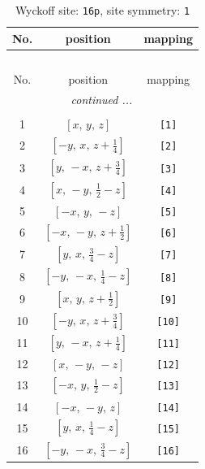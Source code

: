 \documentclass[fleqn,8pt]{jsarticle}
\begin{document}
\begin{longtable}{ccc}
\caption{Wyckoff site: {\tt 16p}, site symmetry: {\tt 1}}
 \\
 \hline \hline
No. & position & mapping \\ \hline \endfirsthead

\multicolumn{2}{l}{\tablename\ \thetable{}} \\
 \hline \hline
No. & position & mapping \\ \hline \endhead

 \hline \hline
\multicolumn{2}{r}{\footnotesize\it continued ...} \\ \endfoot

 \hline \hline
\multicolumn{2}{r}{} \\ \endlastfoot

1 & $\left[ x,\, y,\, z \right]$ & {\tt [1]} \\ \hline
2 & $\left[ - y,\, x,\, z + \frac{1}{4} \right]$ & {\tt [2]} \\ \hline
3 & $\left[ y,\, - x,\, z + \frac{3}{4} \right]$ & {\tt [3]} \\ \hline
4 & $\left[ x,\, - y,\, \frac{1}{2} - z \right]$ & {\tt [4]} \\ \hline
5 & $\left[ - x,\, y,\, - z \right]$ & {\tt [5]} \\ \hline
6 & $\left[ - x,\, - y,\, z + \frac{1}{2} \right]$ & {\tt [6]} \\ \hline
7 & $\left[ y,\, x,\, \frac{3}{4} - z \right]$ & {\tt [7]} \\ \hline
8 & $\left[ - y,\, - x,\, \frac{1}{4} - z \right]$ & {\tt [8]} \\ \hline
9 & $\left[ x,\, y,\, z + \frac{1}{2} \right]$ & {\tt [9]} \\ \hline
10 & $\left[ - y,\, x,\, z + \frac{3}{4} \right]$ & {\tt [10]} \\ \hline
11 & $\left[ y,\, - x,\, z + \frac{1}{4} \right]$ & {\tt [11]} \\ \hline
12 & $\left[ x,\, - y,\, - z \right]$ & {\tt [12]} \\ \hline
13 & $\left[ - x,\, y,\, \frac{1}{2} - z \right]$ & {\tt [13]} \\ \hline
14 & $\left[ - x,\, - y,\, z \right]$ & {\tt [14]} \\ \hline
15 & $\left[ y,\, x,\, \frac{1}{4} - z \right]$ & {\tt [15]} \\ \hline
16 & $\left[ - y,\, - x,\, \frac{3}{4} - z \right]$ & {\tt [16]} \\
\end{longtable}
\end{document}
